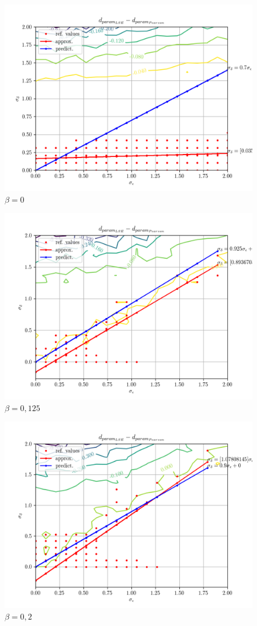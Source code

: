 \documentclass[a4paper,landscape,hidelinks,14pt]{extarticle}
\begin{document}
\begin{figure}[h!]
  \centering
  \includegraphics[width=.8\linewidth]{fig/beta-0_param-accs-diff-approx.png}
  \caption{$ \beta = 0 $}\label{fig:beta-0}
\end{figure}

\begin{figure}[h!]
  \centering
  \includegraphics[width=.8\linewidth]{fig/beta-0,125_param-accs-diff-approx.png}
  \caption{$ \beta = 0{,}125 $}
\end{figure}

\begin{figure}[h!]
  \centering
  \includegraphics[width=.8\linewidth]{fig/beta-0,2_param-accs-diff-approx.png}
  \caption{$ \beta = 0{,}2 $}
\end{figure}
\end{document}
